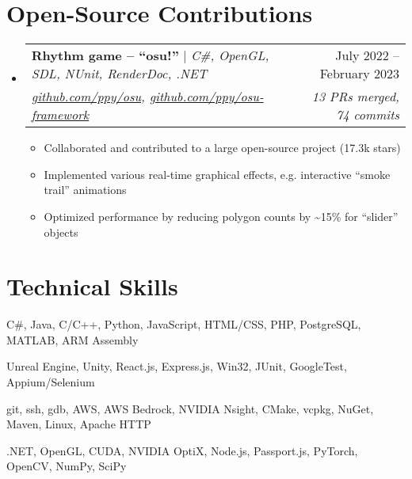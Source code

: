 \documentclass[letterpaper,11pt]{article}
\makeatletter
\newcommand{\resumeItem}[1]{
  \item\small{
    {#1 \vspace{-2pt}}
  }
}
\newcommand{\resumeOSSProjectHeading}[4]{
    \item
    \begin{tabular*}{0.97\textwidth}{l@{\extracolsep{\fill}}r}
      \small#1 & #2 \\
      \textit{\footnotesize #3} & \textit{\footnotesize #4} \\
    \end{tabular*}\vspace{-7pt}
}
\newcommand{\resumeSubHeadingListStart}{\begin{itemize}[leftmargin=0.15in, label={}]}
\newcommand{\resumeSubHeadingListEnd}{\end{itemize}}
\newcommand{\resumeItemListStart}{\begin{itemize}}
\newcommand{\resumeItemListEnd}{\end{itemize}\vspace{-5pt}}
\makeatother
\begin{document}
\section{Open-Source Contributions}
    \resumeSubHeadingListStart
        \resumeOSSProjectHeading
            {\textbf{Rhythm game -- ``osu!''} $|$ \emph{C\#, OpenGL, SDL, NUnit, RenderDoc, .NET}}{July 2022 -- February 2023}
            {\href{https://github.com/ppy/osu/pulls?q=is\%3Apr+author\%3Agoodtrailer+is\%3Aclosed}{github.com/ppy/osu}, \href{https://github.com/ppy/osu-framework/pulls?q=is\%3Apr+author\%3Agoodtrailer+is\%3Aclosed}{github.com/ppy/osu-framework}}{13 PRs merged, 74 commits}
            \resumeItemListStart
                \resumeItem{Collaborated and contributed to a large open-source project (17.3k stars)}
                \resumeItem{Implemented various real-time graphical effects, e.g. interactive ``smoke trail'' animations}
                \resumeItem{Optimized performance by reducing polygon counts by \textasciitilde15\% for ``slider'' objects}
        \resumeItemListEnd
    \resumeSubHeadingListEnd

\section{Technical Skills}
    \small{\begin{description}[leftmargin=0.5in, itemindent=-0.25in, labelindent=0.5in, itemsep=-0.2em]
        \item[Languages] C\#, Java, C/C++, Python, JavaScript, HTML/CSS, PHP, PostgreSQL, MATLAB, ARM Assembly
        \item[Frameworks] Unreal Engine, Unity, React.js, Express.js, Win32, JUnit, GoogleTest, Appium/Selenium
        \item[Developer tools] git, ssh, gdb, AWS, AWS Bedrock, NVIDIA Nsight, CMake, vcpkg, NuGet, Maven, Linux, Apache HTTP
        \item[Libraries/etc.] .NET, OpenGL, CUDA, NVIDIA OptiX, Node.js, Passport.js, PyTorch, OpenCV, NumPy, SciPy
    \end{description}}

\end{document}
